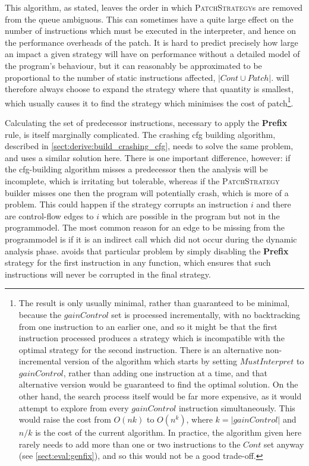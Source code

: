 This algorithm, as stated, leaves the order in which
\textsc{PatchStrategy}s are removed from the queue ambiguous.  This
can sometimes have a quite large effect on the number of instructions
which must be executed in the interpreter, and hence on the
performance overheads of the patch.  It is hard to predict precisely
how large an impact a given strategy will have on performance without
a detailed model of the program's behaviour, but it can reasonably be
approximated to be proportional to the number of static instructions
affected, $|\mathit{Cont} \cup \mathit{Patch}|$.  {\Implementation}
will therefore always choose to expand the strategy where that
quantity is smallest, which usually causes it to find the strategy
which minimises the cost of patch\footnote{The result is only usually
  minimal, rather than guaranteed to be minimal, because the
  $\mathit{gainControl}$ set is processed incrementally, with no
  backtracking from one instruction to an earlier one, and so it might
  be that the first instruction processed produces a strategy which is
  incompatible with the optimal strategy for the second instruction.
  There is an alternative non-incremental version of the algorithm
  which starts by setting $\mathit{MustInterpret}$ to
  $\mathit{gainControl}$, rather than adding one instruction at a
  time, and that alternative version would be guaranteed to find the
  optimal solution.  On the other hand, the search process itself
  would be far more expensive, as it would attempt to explore from
  every $\mathit{gainControl}$ instruction simultaneously.  This would
  raise the cost from $O(nk)$ to $O(n^k)$, where $k =
  |\mathit{gainControl}|$ and $n/k$ is the cost of the current
  algorithm.  In practice, the algorithm given here rarely needs to
  add more than one or two instructions to the $\mathit{Cont}$ set
  anyway (see \autoref{sect:eval:genfix}), and so this would not be a
  good trade-off.}.

Calculating the set of predecessor instructions, necessary to apply
the \textbf{Prefix} rule, is itself marginally complicated.  The
crashing \gls{cfg} building algorithm, described in
\autoref{sect:derive:build_crashing_cfg}, needs to solve the same
problem, and {\technique} uses a similar solution here.  There is one
important difference, however: if the \gls{cfg}-building algorithm
misses a predecessor then the analysis will be incomplete, which is
irritating but tolerable, whereas if the \textsc{PatchStrategy}
builder misses one then the program will potentially crash, which is
more of a problem.  This could happen if the strategy corrupts an
instruction $i$ and there are control-flow edges to $i$ which are
possible in the program but not in the \gls{programmodel}.  The most
common reason for an edge to be missing from the \gls{programmodel} is
if it is an indirect call which did not occur during the dynamic
analysis phase.  {\Implementation} avoids that particular problem by
simply disabling the \textbf{Prefix} strategy for the first
instruction in any function, which ensures that such instructions will
never be corrupted in the final strategy.

